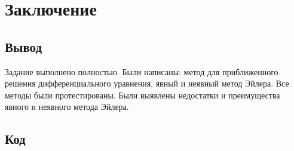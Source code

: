 \documentclass[a4paper,12pt]{article}
\begin{document}
	\section{Заключение}
	\subsection{Вывод}
	Задание выполнено полностью. Были написаны: метод для приближенного решения дифференциального уравнения, явный и неявный метод Эйлера.
	Все методы были протестированы. Были выявлены недостатки и преимущества явного и неявного метода Эйлера.
	\newpage
	\subsection{Код}
	\inputminted{c++}{../lab2/src/main.cpp}
	\inputminted{c++}{../lab2/src/data_table.hpp}
	\inputminted{c++}{../lab2/include/tma.hpp}
	\inputminted{c++}{../lab2/include/euler.hpp}
	\inputminted{c++}{../lab2/include/utils.hpp}
	\inputminted{c++}{../lab2/include/utils/balance_utils.hpp}
	\inputminted{c++}{../lab2/include/utils/data.hpp}
	\inputminted{c++}{../lab2/include/utils/grid.hpp}
\end{document}
